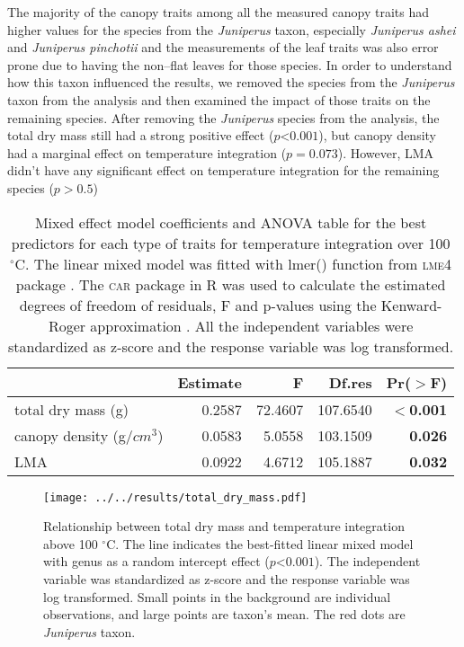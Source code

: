 \documentclass{ttuthes2007}
\newcommand{\pkg}[1]{\textsc{#1}}
\begin{document}
The majority of the canopy traits among all the measured canopy traits had higher values for the species from the \emph{Juniperus} taxon, especially \emph{Juniperus ashei} and \emph{Juniperus pinchotii} and the measurements of the leaf traits was also error prone due to having the non--flat leaves for those species. In order to understand how this taxon influenced the results, we removed the species from the \emph{Juniperus} taxon from the analysis and then examined the impact of those traits on the remaining species. After removing the \emph{Juniperus} species from the analysis, the total dry mass still had a strong positive effect ($p $<$ 0.001$), but canopy density had a marginal effect on temperature integration ($p = 0.073$). However, LMA didn't have any significant effect on temperature integration for the remaining species ($p > 0.5$) 



\begin{table}
\centering
\caption{Mixed effect model coefficients and ANOVA table for the best predictors for each type of traits for temperature integration over 100 $^{\circ}$C. The linear mixed model was fitted with lmer() function from \pkg{lme4} package \citep{bates2009package}. The \pkg{car} package in R \citep{fox2013hypothesis} was used to calculate the estimated degrees of freedom of residuals, F and p-values using the Kenward-Roger approximation \citep{kenward1997small}. All the independent variables were standardized  as z-score and the response variable was log transformed.}
\vspace{0.5 cm}
\begin{tabular}{lrrrr}
  \hline
 &  Estimate & F  & Df.res & Pr($>$F) \\ 
  \hline 
  total dry mass (g) & 0.2587 & 72.4607  & 107.6540 & \textbf{$<$0.001} \\ 
  canopy density (g/{$cm^3$}) & 0.0583 & 5.0558  & 103.1509 & \textbf{0.026} \\ 
  LMA & 0.0922 & 4.6712 &  105.1887 & \textbf{0.032} \\ 
   \hline
\end{tabular}
\label{tab:fandpstatfortemp}
\end{table}


\begin{figure}[ht]
    \centering
    \texttt{[image: ../../results/total\_dry\_mass.pdf]}
    \caption[Dry mass effect on temperature integration]{\label{fig:dm-tempint}Relationship between total dry mass and temperature integration above 100 $^{\circ}$C. The line indicates the best-fitted linear mixed model with genus as a random intercept effect ($p $<$ 0.001$). The independent variable was standardized  as z-score and the response variable was log transformed. Small points in the background are individual observations, and large points are taxon's mean. The red dots are \emph{Juniperus} taxon.}
\end{figure}
\end{document}
